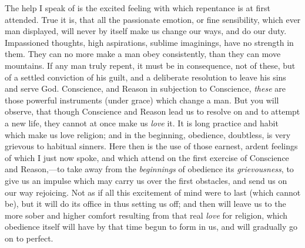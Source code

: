 The help I speak of is the excited feeling with which
repentance is at first attended. True it is, that all the
passionate emotion, or fine sensibility, which ever man
displayed, will never by itself make us change our ways,
and do our duty. Impassioned thoughts, high aspirations,
sublime imaginings, have no strength in them. They can no
more make a man obey consistently, than they can move
mountains. If any man truly repent, it must be in
consequence, not of these, but of a settled conviction of
his guilt, and a deliberate resolution to leave his sins
and serve God. Conscience, and Reason in subjection to
Conscience, \emph{these} are those powerful instruments
(under grace) which change a man. But you will observe,
that though Conscience and Reason lead us to resolve on
and to attempt a new life, they cannot at once make us \emph{love}
it. It is long practice and habit which make us love
religion; and in the beginning, obedience, doubtless, is
very grievous to habitual sinners. Here then is the use
of those earnest, ardent feelings of which I just now
spoke, and which attend on the first exercise of
Conscience and Reason,—to take away from the \emph{beginnings}
of obedience its \emph{grievousness}, to give us an
impulse which may carry us over the first obstacles, and
send us on our way rejoicing. Not as if all this
excitement of mind were to last (which cannot be), but it
will do its office in thus setting us off; and then will
leave us to the more sober and higher comfort resulting from that real \emph{love} for religion, which obedience
itself will have by that time begun to form in us, and
will gradually go on to perfect.

